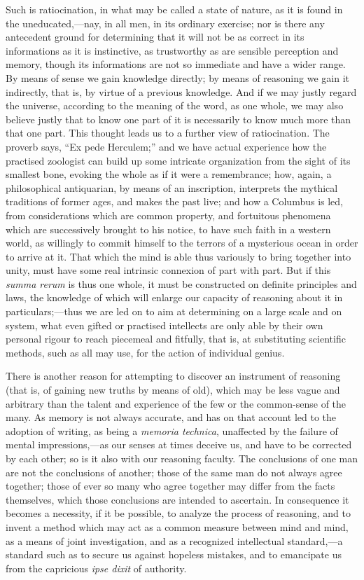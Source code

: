 Such is ratiocination, in what may be called a state of nature, as
it is found in the uneducated,—nay, in all men, in its ordinary
exercise; nor is there any antecedent ground for determining that it
will not be as correct in its informations as it is instinctive, as
trustworthy as are sensible perception and memory, though its
informations are not so immediate and have a wider range. By means of
sense we gain knowledge directly; by means of reasoning we gain it
indirectly, that is, by virtue of a previous knowledge. And if we may
justly regard the universe, according to the meaning of the word, as
one whole, we may also believe justly that to know one part of it is
necessarily to know much more than that one part. This thought leads
us to a further view of ratiocination. The proverb says, ``Ex pede
Herculem;'' and we have actual experience how the practised
zoologist can build up some intricate organization from the
sight of its smallest bone, evoking the whole as if it were a
remembrance; how, again, a philosophical antiquarian, by means of an
inscription, interprets the mythical traditions of former ages, and
makes the past live; and how a Columbus is led, from considerations
which are common property, and fortuitous phenomena which are
successively brought to his notice, to have such faith in a western
world, as willingly to commit himself to the terrors of a mysterious
ocean in order to arrive at it. That which the mind is able thus
variously to bring together into unity, must have some real intrinsic
connexion of part with part. But if this \emph{summa rerum} is thus
one whole, it must be constructed on definite principles and laws, the
knowledge of which will enlarge our capacity of reasoning about it in
particulars;—thus we are led on to aim at determining on a large
scale and on system, what even gifted or practised intellects are only
able by their own personal rigour to reach piecemeal and fitfully,
that is, at substituting scientific methods, such as all may use, for
the action of individual genius.

There is another reason for attempting to discover an instrument of
reasoning (that is, of gaining new truths by means of old), which may
be less vague and arbitrary than the talent and experience of the few
or the common-sense of the many. As memory is not always accurate, and
has on that account led to the adoption of writing, as being a \emph{memoria
technica}, unaffected by the failure of mental impressions,—as
our senses at times deceive us, and have to be corrected by each
other; so is it also with our reasoning faculty. The conclusions
of one man are not the conclusions of another; those of the same man
do not always agree together; those of ever so many who agree together
may differ from the facts themselves, which those conclusions are
intended to ascertain. In consequence it becomes a necessity, if it be
possible, to analyze the process of reasoning, and to invent a method
which may act as a common measure between mind and mind, as a means of
joint investigation, and as a recognized intellectual standard,—a
standard such as to secure us against hopeless mistakes, and to
emancipate us from the capricious \emph{ipse dixit} of authority.

